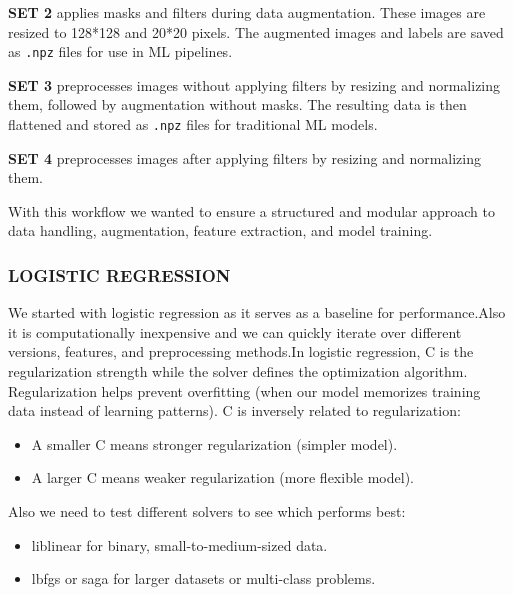 \documentclass{article}
\begin{document}
\textbf{SET 2} applies masks and filters during data augmentation. These images are resized to 128*128 and 20*20 pixels. The augmented images and labels are saved as \texttt{.npz} files for use in ML pipelines.

\textbf{SET 3 } preprocesses images without applying filters by resizing and normalizing them, followed by augmentation without masks. The resulting data is then flattened and stored as \texttt{.npz} files for traditional ML models.

\textbf{SET 4 }preprocesses images after applying filters by resizing and normalizing them.

With this workflow we wanted to ensure a structured and modular approach to data handling, augmentation, feature extraction, and model training.
\\

\subsubsection{LOGISTIC REGRESSION}
We started with logistic regression as it serves as a baseline for performance.Also it is computationally inexpensive and we can quickly iterate over different versions, features, and preprocessing methods.In logistic regression, C is the regularization strength while the solver defines the optimization algorithm.	Regularization helps prevent overfitting (when our model memorizes training data instead of learning patterns).
C is inversely related to regularization:
\begin{itemize}
    \item A smaller C means stronger regularization (simpler model).
    \item A larger C means weaker regularization (more flexible model).
\end{itemize}
Also we need to test different solvers to see which performs best:
\begin{itemize}
    \item liblinear for binary, small-to-medium-sized data.
    \item lbfgs or saga for larger datasets or multi-class problems.
\end{itemize}
\end{document}
